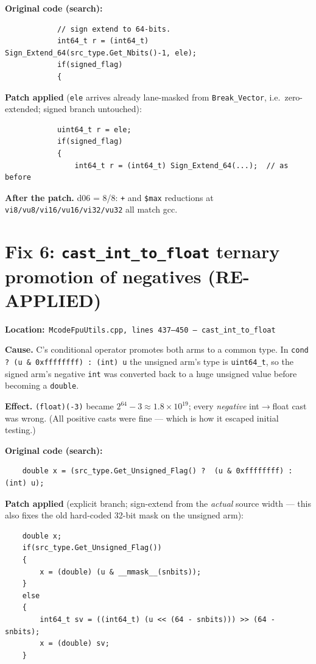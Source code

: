 \documentclass[11pt,a4paper]{report}
\newcommand{\filepath}[1]{\noindent\textbf{Location:}\ \texttt{#1}\par}
\begin{document}
\textbf{Original code (search):}
\begin{lstlisting}
            // sign extend to 64-bits.
            int64_t r = (int64_t) Sign_Extend_64(src_type.Get_Nbits()-1, ele);
            if(signed_flag)
            {
\end{lstlisting}

\textbf{Patch applied} (\texttt{ele} arrives already lane-masked from
\texttt{Break\_Vector}, i.e.\ zero-extended; signed branch untouched):
\begin{lstlisting}
            uint64_t r = ele;
            if(signed_flag)
            {
                int64_t r = (int64_t) Sign_Extend_64(...);  // as before
\end{lstlisting}

\textbf{After the patch.} d06 = 8/8: \texttt{+} and \texttt{\$max}
reductions at \texttt{vi8/vu8/vi16/vu16/vi32/vu32} all match gcc.

\section{Fix 6: \texttt{cast\_int\_to\_float} ternary promotion of negatives (RE-APPLIED)}

\filepath{McodeFpuUtils.cpp, lines 437--450 --- cast\_int\_to\_float}

\textbf{Cause.} C's conditional operator promotes both arms to a common
type. In
\texttt{cond ? (u \& 0xffffffff) : (int) u}
the unsigned arm's type is \texttt{uint64\_t}, so the signed arm's negative
\texttt{int} was converted back to a huge unsigned value before becoming a
\texttt{double}.

\textbf{Effect.} \texttt{(float)(-3)} became $2^{64}-3 \approx
1.8\times10^{19}$; every \emph{negative} int$\to$float cast was wrong.
(All positive casts were fine --- which is how it escaped initial testing.)

\textbf{Original code (search):}
\begin{lstlisting}
    double x = (src_type.Get_Unsigned_Flag() ?  (u & 0xffffffff) : (int) u);
\end{lstlisting}

\textbf{Patch applied} (explicit branch; sign-extend from the \emph{actual}
source width --- this also fixes the old hard-coded 32-bit mask on the
unsigned arm):
\begin{lstlisting}
    double x;
    if(src_type.Get_Unsigned_Flag())
    {
        x = (double) (u & __mmask__(snbits));
    }
    else
    {
        int64_t sv = ((int64_t) (u << (64 - snbits))) >> (64 - snbits);
        x = (double) sv;
    }
\end{lstlisting}
\end{document}
